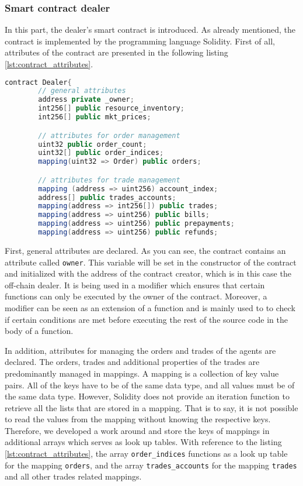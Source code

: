 \subsubsection{Smart contract dealer}
\label{sec:smart_contract_dealer}
In this part, the dealer's smart contract is introduced. 
As already mentioned, the contract is implemented by the programming language Solidity. 
First of all, attributes of the contract are presented in the following listing \ref{lst:contract_attributes}.

\begin{lstlisting}[float=htbp, label=lst:contract_attributes, caption=Attributes of Smart Contract, language=Java]
    contract Dealer{
        // general attributes
        address private _owner;
        int256[] public resource_inventory;
        int256[] public mkt_prices;

        // attributes for order management
        uint32 public order_count;
        uint32[] public order_indices;
        mapping(uint32 => Order) public orders;

        // attributes for trade management
        mapping (address => uint256) account_index; 
        address[] public trades_accounts;
        mapping(address => int256[]) public trades;
        mapping(address => uint256) public bills;
        mapping(address => uint256) public prepayments;
        mapping(address => uint256) public refunds;
\end{lstlisting}

First, general attributes are declared. As you can see, the contract contains an attribute called \verb|owner|.
This variable will be set in the constructor of the contract and initialized with the address of the contract creator,
which is in this case the off-chain dealer.  
It is being used in a modifier which ensures that certain functions can only be executed by the owner of the contract.
Moreover, a modifier can be seen as an extension of a function and is mainly used to 
to check if certain conditions are met before executing the rest of the source code in the body of a function.

In addition, attributes for managing the orders and trades of the agents are declared. 
The orders, trades and additional properties of the trades are predominantly managed in mappings.
A mapping is a collection of key value pairs. All of the keys have to be of the same data type, and 
all values must be of the same data type. However, Solidity does not provide an iteration
function to retrieve all the lists that are stored in a mapping. 
That is to say, it is not possible to read the values from the mapping without knowing the respective keys.
Therefore, we developed a work around and store the keys of mappings in additional arrays which serves 
as look up tables.
With reference to the listing \ref{lst:contract_attributes}, the array \verb|order_indices| functions as a 
look up table for the mapping \verb|orders|, and the array \verb|trades_accounts| for the mapping 
\verb|trades| and all other trades related mappings.

